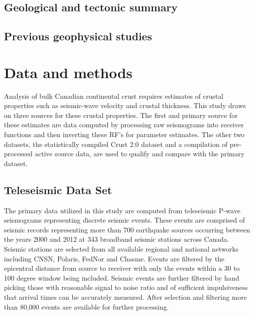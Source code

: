 \documentclass[draft, 12pt]{article}
\begin{document}
\subsection{Geological and tectonic summary}


\subsection{Previous geophysical studies}

\section{Data and methods}
  Analysis of bulk Canadian continental crust requires estimates of crustal properties such as seismic-wave velocity and crustal thickness. This study draws on three sources for these crustal properties. The first and primary source for these estimates are data computed by processing raw seismograms into receiver functions and then inverting these RF's for parameter estimates. The other two datasets, the statistically compiled Crust 2.0 dataset and a compilation of pre-processed active source data, are used to qualify and compare with the primary dataset.

\subsection{Teleseismic Data Set}

  The primary data utilized in this study are computed from teleseismic P-wave seismograms representing discrete seismic events. These events are comprised of seismic records representing more than 700 earthquake sources occurring between the years 2000 and 2012 at 343 broadband seismic stations across Canada. Seismic stations are selected from all available regional and national networks including CNSN, Polaris, FedNor and Chasme. Events are filtered by the epicentral distance from source to receiver with only the events within a 30 to 100 degree window being included. Seismic events are further filtered by hand picking those with reasonable signal to noise ratio and of sufficient impulsiveness that arrival times can be accurately measured. After selection and filtering more than 80,000 events are available for further processing.
\end{document}
